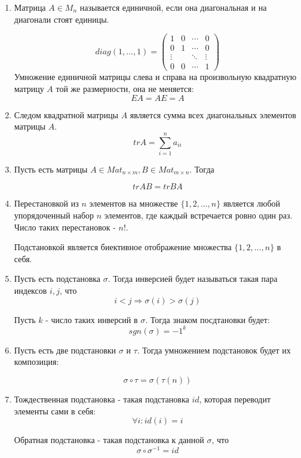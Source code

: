 \documentclass[a4paper,12pt]{article}
\begin{document}
\begin{enumerate}
		\item Матрица $A \in M_n$ называется единичной, если она диагональная и на диагонали стоят единицы.
		
		\[
		diag(1, \ldots, 1) = 
		\begin{pmatrix}
			1 & 0 & \cdots & 0 \\
			0 & 1 & \cdots & 0 \\
			\vdots && \ddots & \vdots \\
			0 & 0 & \cdots & 1
		\end{pmatrix}
		\]
		Умножение единичной матрицы слева и справа на произвольную квадратную матрицу $A$ той же размерности, она не меняется:
		\[
		EA = AE = A
		\]
		
		\item Следом квадратной матрицы $A$ является сумма всех диагональных элементов матрицы $A$.
		\[
		trA = \sum_{i = 1}^{n}a_{ii}
		\]
		
		\item Пусть есть матрицы $A \in Mat_{n \times m}, B \in Mat_{m \times n}$. Тогда
		
		\[
		trAB = trBA
		\]
		
		\item Перестановкой из $n$ элементов на множестве $\{1, 2, \ldots, n\}$ является любой упорядоченный набор $n$ элементов, где каждый встречается ровно один раз. Число таких перестановок - $n!$.
		
		Подстановкой является биективное отображение множества $\{1, 2, \ldots , n\}$ в себя.
		
		\item Пусть есть подстановка $\sigma$. Тогда инверсией будет называться такая пара индексов $i, j$, что 
		\[
		i < j \Rightarrow \sigma(i) > \sigma(j)
		\]
		
		Пусть $k$ - число таких инверсий в $\sigma$. Тогда знаком посдтановки будет:
		\[
		sgn(\sigma) = -1^k
		\]
		\item Пусть есть две подстановки $\sigma$ и $\tau$. Тогда умножением подстановок будет их композиция:
		
		\[
		\sigma \circ \tau = \sigma(\tau(n))
		\]
		
		\item Тождественная подстановка - такая подстановка $id$, которая переводит элементы сами в себя:
		\[
		\forall i: id(i) = i
		\]
		
		Обратная подстановка - такая подстановка к данной $\sigma$, что \[
		\sigma \circ \sigma^{-1} = id
		\]
		

\end{enumerate}
\end{document}
